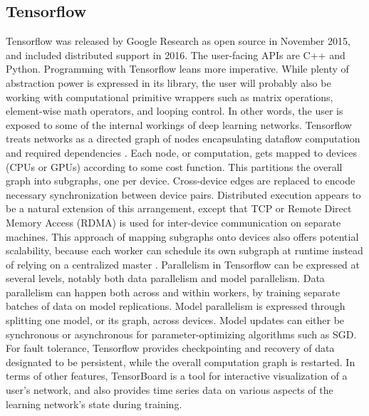 \subsection{Tensorflow}
Tensorflow was released by Google Research as open source in November 2015, and included distributed support in 2016. The user-facing APIs are C++ and Python. Programming with Tensorflow leans more imperative. While plenty of abstraction power is expressed in its library, the user will probably also be working with computational primitive wrappers such as matrix operations, element-wise math operators, and looping control. In other words, the user is exposed to some of the internal workings of deep learning networks. Tensorflow treats networks as a directed graph of nodes encapsulating dataflow computation and required dependencies \cite{DBLP:journals/corr/AbadiABBCCCDDDG16}. Each node, or computation, gets mapped to devices (CPUs or GPUs) according to some cost function. This partitions the overall graph into subgraphs, one per device. Cross-device edges are replaced to encode necessary synchronization between device pairs. Distributed execution appears to be a natural extension of this arrangement, except that TCP or Remote Direct Memory Access (RDMA) is used for inter-device communication on separate machines. This approach of mapping subgraphs onto devices also offers potential scalability, because each worker can schedule its own subgraph at runtime instead of relying on a centralized master \cite{DBLP:journals/corr/AbadiABBCCCDDDG16}. Parallelism in Tensorflow can be expressed at several levels, notably both data parallelism and model parallelism. Data parallelism can happen both across and within workers, by training separate batches of data on model replications. Model parallelism is expressed through splitting one model, or its graph, across devices. Model updates can either be synchronous or asynchronous for parameter-optimizing algorithms such as SGD. For fault tolerance, Tensorflow provides checkpointing and recovery of data designated to be persistent, while the overall computation graph is restarted. In terms of other features, TensorBoard is a tool for interactive visualization of a user's network, and also provides time series data on various aspects of the learning network's state during training.

